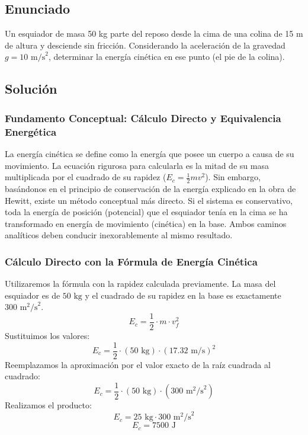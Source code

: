 \documentclass[12pt,a4paper]{article}
\begin{document}
\newpage
\subsection*{Enunciado}
Un esquiador de masa 50 kg parte del reposo desde la cima de una colina de 15 m de altura y desciende sin fricción. Considerando la aceleración de la gravedad $g = 10 \text{ m/s}^2$, determinar la energía cinética en ese punto (el pie de la colina).

\begin{center}
\end{center}

\subsection*{Solución}

\subsubsection*{Fundamento Conceptual: Cálculo Directo y Equivalencia Energética}
La energía cinética se define como la energía que posee un cuerpo a causa de su movimiento. La ecuación rigurosa para calcularla es la mitad de su masa multiplicada por el cuadrado de su rapidez ($E_c = \frac{1}{2}mv^2$). Sin embargo, basándonos en el principio de conservación de la energía explicado en la obra de Hewitt, existe un método conceptual más directo. Si el sistema es conservativo, toda la energía de posición (potencial) que el esquiador tenía en la cima se ha transformado en energía de movimiento (cinética) en la base. Ambos caminos analíticos deben conducir inexorablemente al mismo resultado.

\subsubsection*{Cálculo Directo con la Fórmula de Energía Cinética}
Utilizaremos la fórmula con la rapidez calculada previamente. La masa del esquiador es de $50 \text{ kg}$ y el cuadrado de su rapidez en la base es exactamente $300 \text{ m}^2\text{/s}^2$.
$$E_c = \frac{1}{2} \cdot m \cdot v_f^2$$
Sustituimos los valores:
$$E_c = \frac{1}{2} \cdot (50 \text{ kg}) \cdot (17.32 \text{ m/s})^2$$
Reemplazamos la aproximación por el valor exacto de la raíz cuadrada al cuadrado:
$$E_c = \frac{1}{2} \cdot (50 \text{ kg}) \cdot (300 \text{ m}^2\text{/s}^2)$$
Realizamos el producto:
$$E_c = 25 \text{ kg} \cdot 300 \text{ m}^2\text{/s}^2$$
$$E_c = 7500 \text{ J}$$
\end{document}
